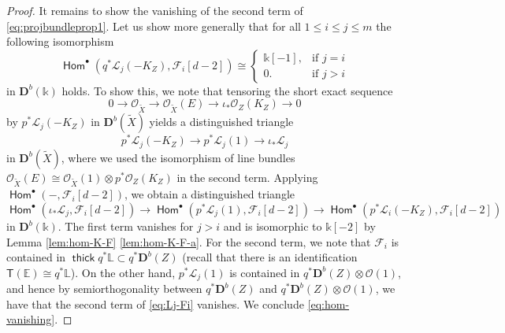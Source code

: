 \documentclass[a4paper,11pt, reqno]{amsart}
\def\E{\mathbb E}
\def\L{\mathbb L}
\def\DD{\mathbf D}
\def\OO{\mathcal O}
\def\sF{\mathscr{F}}
\def\sL{\mathscr{L}}
\newcommand{\opname}[1]{\operatorname{\mathsf{#1}}}
\newcommand{\Hom}{\opname{Hom}}
\newcommand{\thick}{\opname{thick}\nolimits}
\def\Db{\DD^b}
\newcommand{\bT}{\mathsf{T}}
\theoremstyle{plain}
\theoremstyle{definition}
\numberwithin{equation}{section}
\begin{document}
\begin{proof}
    It remains to show the vanishing of the second term of \eqref{eq:projbundleprop1}.
        Let us show more generally that for all $1\leq i \leq j \leq m$ the following isomorphism 
    \begin{equation}\label{eq:hom-vanishing}
      \Hom^\bullet ( q^\ast \sL_j (-K_Z) , \sF_{i}[d-2] ) \cong \begin{cases}
        \mathbb{k}[-1],& \text{if $j=i$} \\
        0.& \text{if $j>i$}
    \end{cases}  
    \end{equation}
    in $\Db(\mathbb{k})$ holds.
    To show this, we note that tensoring the short exact sequence 
    \[
    0\to \OO_{\tilde{X}} \to \OO_{\tilde{X}} (E) \to \iota_\ast \OO_Z ( K_Z ) \to 0
    \]
    by $p^\ast \sL_j ( -K_Z )$ in $\Db( \tilde{X} )$ 
    yields a distinguished triangle 
    \[
    p^\ast \sL_j ( -K_Z ) \to p^\ast \sL_j ( 1 ) \to \iota_\ast \sL_j 
    \]
    in $\Db( \tilde{X} )$,
    where we used the isomorphism of line bundles $\OO_{\tilde{X}}(E) \cong \OO_{\tilde{X}}( 1 ) \otimes p^\ast \OO_Z(K_Z)$ in the second term.
    Applying $\Hom^\bullet ( - , \sF_i [d-2])$, we obtain a distinguished triangle 
    \begin{equation}\label{eq:Lj-Fi}
        \Hom^\bullet ( \iota_\ast\sL_j , \sF_i [d-2] ) \to \Hom^\bullet ( p^\ast \sL_j ( 1 ) , \sF_i [d-2] ) \to \Hom^\bullet ( p^\ast\sL_i (-K_Z ) , \sF_i [d-2] )
    \end{equation}
    in $\Db(\mathbb{k})$.
    The first term vanishes for $j>i$ and is isomorphic to $\mathbb{k}[-2]$ by Lemma \ref{lem:hom-K-F} \eqref{lem:hom-K-F-a}.
    For the second term, we note that $\sF_i $ is contained in $\thick q^\ast \L  \subset q^\ast \Db(Z) $ (recall that there is an identification $\bT  (\E ) \cong q^\ast \L$).
    On the other hand, $p^\ast \sL_j ( 1 )$ is contained in $q^\ast \Db(Z) \otimes \OO(1)$, and hence by semiorthogonality between $q^\ast \Db(Z)$ and $q^\ast \Db(Z) \otimes \OO(1)$, we have that the second term of \eqref{eq:Lj-Fi} vanishes.
    We conclude \eqref{eq:hom-vanishing}.


\end{proof}
\end{document}
